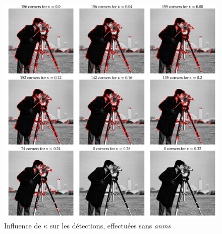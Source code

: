 \documentclass[12pt,a4paper,onecolumn]{article}
\begin{document}
\begin{figure}[H]
	\centering
	\includegraphics[width = 1.0\textwidth]{2_cameraman_kappa}
	\caption{Influence de \(\kappa\) sur les détections, effectuées sans \textit{anms}}
	\label{fig_2_kappa}
\end{figure}
\end{document}
